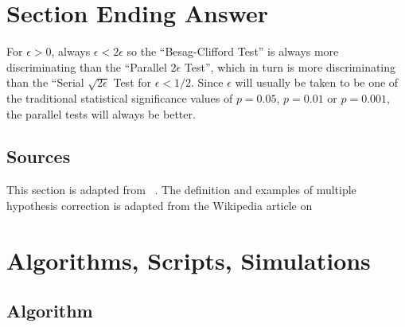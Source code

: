 \documentclass[12pt]{article}
\begin{document}

\section*{Section Ending Answer} For \( \epsilon > 0 \), always \(
\epsilon < 2 \epsilon \) so the ``Besag-Clifford Test'' is always more
discriminating than the ``Parallel \( 2 \epsilon \) Test'', which in
turn is more discriminating than the ``Serial \( \sqrt{2 \epsilon} \)
Test for \( \epsilon < 1/2 \).  Since \( \epsilon \) will usually be
taken to be one of the traditional statistical significance values of \(
p = 0.05 \), \( p = 0.01 \) or \( p = 0.001 \), the parallel tests will
always be better.

\subsection*{Sources} This section is adapted from~%
\cite{doi:10.1080/2330443X.2020.1806763}.  The definition and examples
of multiple hypothesis correction is adapted from the Wikipedia article
on 

\hr

\section*{Algorithms, Scripts, Simulations}

\subsection*{Algorithm}
\end{document}
